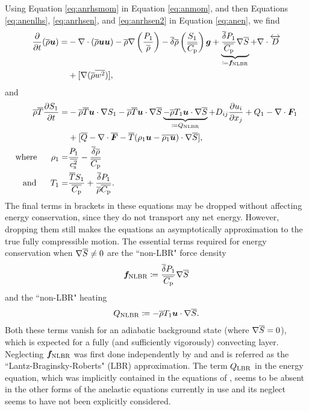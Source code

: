 \documentclass[12pt]{article}
\newcommand{\vecf}{\bm{F}}
\newcommand{\deltaref}{\overline{\delta}}
\newcommand{\cpref}{\overline{\cpcap}}
\newcommand{\cssqref}{\overline{\cs^2}}
\begin{document}
Using Equation \eqref{eq:anrhsmom} in Equation \eqref{eq:anmom}, and then Equations \eqref{eq:anenlhs}, \eqref{eq:anrhsen}, and \eqref{eq:anrhsen2} in Equation \eqref{eq:anen}, we find
	\begin{align}\label{eq:anmommod}
		\pderiv{}{t}(\rhoref\vecu)= &-\Div(\rhoref\vecu\vecu) -\rhoref\nabla\left(\frac{P_1}{\rhoref}\right) - \deltaref \rhoref \left(\frac{S_1}{\cpref}\right) \vecg + \underbrace{\frac{\deltaref P_1}{\cpref} \nabla\sref}_{\define \bm{f}_{\rm NLBR}}+\Div \overleftrightarrow{D}\nonumber\\
		&+[\nabla(\rhoref\overline{w^2})],
	\end{align}
and
\begin{subequations}\label{eq:anenmod}
\begin{align}
	\rhoref\tmpref\pderiv{S_1}{t}= &-\rhoref\tmpref\ugrad S_1 - \rhoref \tmpref \ugrad \sref \underbrace{- \rhoref T_1\ugrad\sref}_{\define Q_{\rm NLBR}}+D_{ij}\pderiv{u_i}{x_j} + Q _1- \Div\vecf_1  \nonumber\\
	& +[\qref - \Div\overline{\vecf} - \tmpref(\rho_1\vecu-\overline{\rho_1\vecu})\cdot\nabla\sref],\\
	\where \rho_1 =& \frac{P_1}{\cssqref}-\frac{\deltaref\rhoref}{\cpref}\\
	\andd T_1 = & \frac{\tmpref S_1}{\cpref} + \frac{\deltaref P_1}{\rhoref\cpref}.
\end{align}
\end{subequations}
The final terms in brackets in these equations may be dropped without affecting energy conservation, since they do not transport any net energy. However, dropping them still makes the equations an asymptotically approximation to the true fully compressible motion. The essential terms required for energy conservation when $\nabla\overline{S}\neq0$ are the ``non-LBR" force density
\begin{align}
	\bm{f}_{\rm NLBR} \define \frac{\deltaref P_1}{\cpref} \nabla\sref
\end{align}
and the ``non-LBR" heating
\begin{align}\label{eq:nlbrheat}
	Q_{\rm NLBR} \coloneqq -\overline{\rho} T_1\bm{u}\cdot\nabla\overline{S}.
\end{align}
Both these terms vanish for an adiabatic background state (where $\nabla\overline{S}=0$), which is expected for a fully (and sufficiently vigorously) convecting layer.  Neglecting $\bm{f}_{\rm NLBR}$ was first done independently by \citet{Lantz1992} and \citet{Braginsky1995} and is referred as the ``Lantz-Braginsky-Roberts" (LBR) approximation. The term $Q_{\rm LBR}$ in the energy equation, which was implicitly contained in the equations of \citet{Gough1969}, seems to be absent in the other forms of the anelastic equations currently in use and its neglect seems to have not been explicitly considered. 
\end{document}
